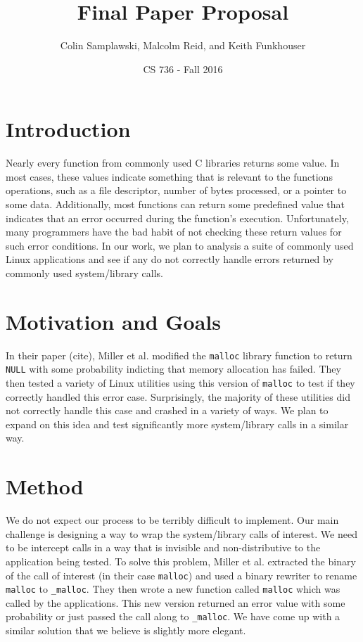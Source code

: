 \documentclass[10pt]{article}
\title{Final Paper Proposal}
\author{Colin Samplawski, Malcolm Reid, and Keith Funkhouser}
\date{CS 736 - Fall 2016}
\begin{document}
\maketitle
\setlength{\baselineskip}{18pt}
\section{Introduction}
Nearly every function from commonly used C libraries returns some value. In most cases, these values indicate something that is relevant to the  functions operations, such as a file descriptor, number of bytes processed, or a pointer to some data. Additionally, most functions can return some predefined value that indicates that an error occurred during the function's execution. Unfortunately, many programmers have the bad habit of not checking these return values for such error conditions. In our work, we plan to analysis a suite of commonly used Linux applications and see if any do not correctly handle errors returned by commonly used system/library calls.

\section{Motivation and Goals}
In their paper (cite), Miller et al. modified the \texttt{malloc} library function to return \texttt{NULL} with some probability indicting that memory allocation has failed. They then tested a variety of Linux utilities using this version of \texttt{malloc} to test if they correctly handled this error case. Surprisingly, the majority of these utilities did not correctly handle this case and crashed in a variety of ways. We plan to expand on this idea and test significantly more system/library calls in a similar way.

\section{Method}
We do not expect our process to be terribly difficult to implement. Our main challenge is designing a way to wrap the system/library calls of interest. We need to be intercept calls in a way that is invisible and non-distributive to the application being tested. To solve this problem, Miller et al. extracted the binary of the call of interest (in their case \texttt{malloc}) and used a binary rewriter to rename \texttt{malloc} to \texttt{\_malloc}. They then wrote a new function called \texttt{malloc} which was called by the applications. This new version returned an error value with some probability or just passed the call along to \texttt{\_malloc}. We have come up with a similar solution that we believe is slightly more elegant.
\end{document}
